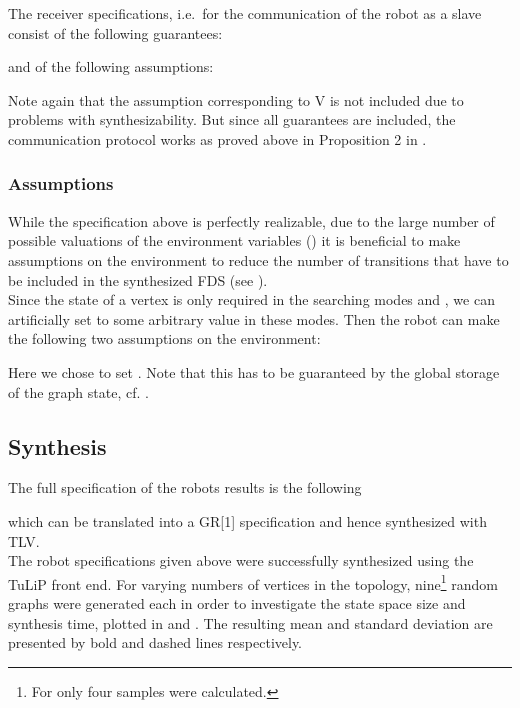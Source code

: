 The receiver specifications, i.e.\ for the communication of the robot as a slave consist of the following guarantees:

and of the following assumptions:

Note again that the assumption  corresponding to V is not included due to problems with synthesizability. But since all guarantees are included, the communication protocol works as proved above in Proposition 2 in .\\


\subsubsection{Assumptions}

While the specification above is perfectly realizable, due to the large number of possible valuations of the environment variables () it is beneficial to make assumptions on the environment to reduce the number of transitions that have to be included in the synthesized FDS (see ).\\

Since the state of a vertex is only required in the searching modes  and , we can artificially set  to some arbitrary value in these modes. Then the robot can make the following two assumptions on the environment:

Here we chose to set . Note that this has to be guaranteed by the global storage of the graph state, cf. .\\


\subsection{Synthesis}
	
The full specification of the robots results is the following

which can be translated into a GR[1] specification and hence synthesized with TLV.\\

The robot specifications given above were successfully synthesized using the TuLiP front end. For varying numbers of vertices in the topology, nine\footnote{For  only four samples were calculated.} random graphs were generated each in order to investigate the state space size and synthesis time,  plotted in  and . The resulting mean and standard deviation are presented by bold and dashed lines respectively.\\

